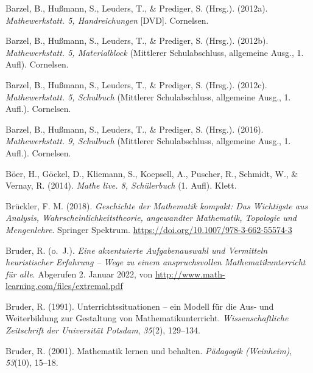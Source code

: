 \documentclass[
]{scrbook}
\newlength{\cslhangindent}
\newlength{\cslentryspacingunit} %
\newenvironment{CSLReferences}[2] %
 {%
  \setlength{\parindent}{0pt}
  \ifodd #1
  \let\oldpar\par
  \def\par{\hangindent=\cslhangindent\oldpar}
  \fi
  \setlength{\parskip}{#2\cslentryspacingunit}
 }%
 {}
\theoremstyle{definition}
\theoremstyle{definition}
\theoremstyle{definition}
\theoremstyle{definition}
\theoremstyle{remark}
\begin{document}
\hypertarget{refs}{}
\begin{CSLReferences}{1}{0}
\leavevmode{}%
Barzel, B., Hußmann, S., Leuders, T., \& Prediger, S. (Hrsg.). (2012a). \emph{Mathewerkstatt. 5, {Handreichungen}} {[}DVD{]}. Cornelsen.

\leavevmode{}%
Barzel, B., Hußmann, S., Leuders, T., \& Prediger, S. (Hrsg.). (2012b). \emph{Mathewerkstatt. 5, {Materialblock}} (Mittlerer Schulabschluss, allgemeine Ausg., 1. Aufl). Cornelsen.

\leavevmode{}%
Barzel, B., Hußmann, S., Leuders, T., \& Prediger, S. (Hrsg.). (2012c). \emph{Mathewerkstatt. 5, {Schulbuch}} (Mittlerer Schulabschluss, allgemeine Ausg., 1. Aufl.). Cornelsen.

\leavevmode{}%
Barzel, B., Hußmann, S., Leuders, T., \& Prediger, S. (Hrsg.). (2016). \emph{Mathewerkstatt. 9, {Schulbuch}} (Mittlerer Schulabschluss, allgemeine Ausg., 1. Aufl.). Cornelsen.

\leavevmode{}%
Böer, H., Göckel, D., Kliemann, S., Koepsell, A., Puscher, R., Schmidt, W., \& Vernay, R. (2014). \emph{Mathe live. 8, {Schülerbuch}} (1. Aufl). Klett.

\leavevmode{}%
Brückler, F. M. (2018). \emph{Geschichte der {Mathematik} kompakt: {Das} {Wichtigste} aus {Analysis}, {Wahrscheinlichkeitstheorie}, angewandter {Mathematik}, {Topologie} und {Mengenlehre}}. Springer Spektrum. \url{https://doi.org/10.1007/978-3-662-55574-3}

\leavevmode{}%
Bruder, R. (o.~J.). \emph{Eine akzentuierte {Aufgabenauswahl} und {Vermitteln} heuristischer {Erfahrung} -- {Wege} zu einem anspruchsvollen {Mathematikunterricht} für alle}. Abgerufen 2. Januar 2022, von \url{http://www.math-learning.com/files/extremal.pdf}

\leavevmode{}%
Bruder, R. (1991). Unterrichtssituationen -- ein {Modell} für die {Aus}- und {Weiterbildung} zur {Gestaltung} von {Mathematikunterricht}. \emph{Wissenschaftliche Zeitschrift der Universität Potsdam}, \emph{35}(2), 129--134.

\leavevmode{}%
Bruder, R. (2001). Mathematik lernen und behalten. \emph{Pädagogik (Weinheim)}, \emph{53}(10), 15--18.


\end{CSLReferences}
\end{document}
